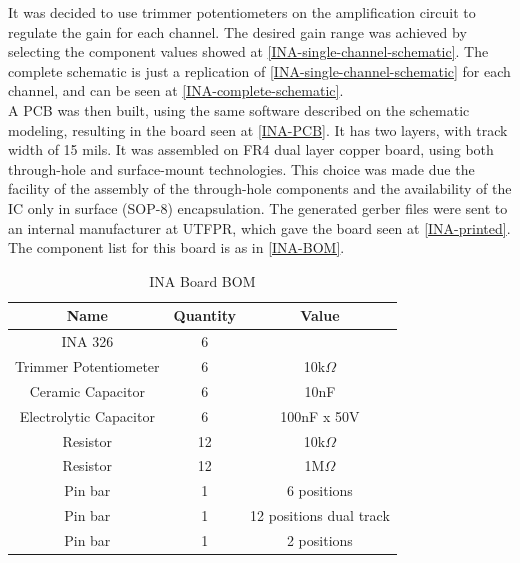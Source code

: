 It was decided to use trimmer potentiometers on the amplification circuit to
regulate the gain for each channel. The desired gain range was achieved by selecting
the component values showed at \autoref{INA-single-channel-schematic}. The complete
schematic is just a replication of \autoref{INA-single-channel-schematic}
for each channel, and can be seen at \autoref{INA-complete-schematic}.\\
A PCB was then built, using the same software described on the schematic modeling, resulting
in the board seen at \autoref{INA-PCB}. It has two layers, with track width of 15 mils.
It was assembled on FR4 dual layer copper board, using both through-hole and
surface-mount technologies. This choice was made due the facility of the assembly
of the through-hole components and the availability of the IC only in surface (SOP-8)
encapsulation. The generated gerber files were sent to an internal manufacturer
at UTFPR, which gave the board seen at \autoref{INA-printed}.\\
The component list for this board is as in \autoref{INA-BOM}.
\begin{table}[htb]
  \begin{center}
    \ABNTEXreducedfont
    \caption[INA Board BOM]{INA Board BOM}
    \label{INA-BOM}
    \begin{tabular}{c|c|c}
      \hline
      Name & Quantity & Value\\
      \hline \hline
      INA 326 & 6 & \\
      Trimmer Potentiometer & 6 & 10k$\Omega$ \\
      Ceramic Capacitor & 6 & 10nF \\
      Electrolytic Capacitor & 6 & 100nF x 50V \\
      Resistor & 12 & 10k$\Omega$ \\
      Resistor & 12 & 1M$\Omega$ \\
      Pin bar & 1 & 6 positions  \\
      Pin bar & 1 & 12 positions dual track \\
      Pin bar & 1 & 2 positions \\
      \hline
    \end{tabular}
  \end{center}
\end{table}

